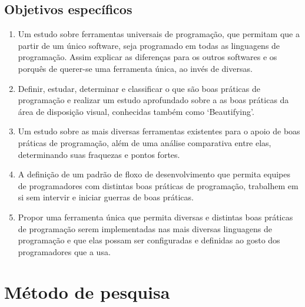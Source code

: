{\subsection{Objetivos específicos}

    \begin{enumerate}

        \item

        Um estudo sobre ferramentas universais de programação, que permitam que
        a partir de um único software, seja programado em todas as linguagens de
        programação. Assim explicar as diferenças para os outros softwares e os
        porquês de querer-se uma ferramenta única, ao invés de diversas.

        \item

        Definir, estudar, determinar e classificar o que são boas práticas de
        programação e realizar um estudo aprofundado sobre a as boas práticas da
        área de disposição visual, conhecidas também como `Beautifying'.

        \item

        Um estudo sobre as mais diversas ferramentas existentes para o apoio de
        boas práticas de programação, além de uma análise comparativa entre
        elas, determinando suas fraquezas e pontos fortes.

        \item

        A definição de um padrão de floxo de desenvolvimento que permita equipes
        de programadores com distintas boas práticas de programação, trabalhem
        em si sem intervir e iniciar guerras de boas práticas.

        \item

        Propor uma ferramenta única que permita diversas e distintas boas
        práticas de programação serem implementadas nas mais diversas linguagens
        de programação e que elas possam ser configuradas e definidas ao gosto
        dos programadores que a usa.

    \end{enumerate}


\section{Método de pesquisa}

}
